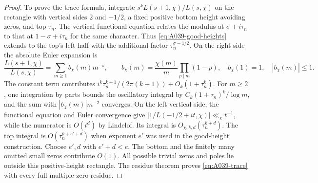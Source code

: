 \begin{proof}
To prove the trace formula, integrate
$s^kL(s+1,\chi)/L(s,\chi)$ on the rectangle with vertical
sides $2$ and $-1/2$, a fixed positive bottom height avoiding
zeros, and top $\tau_n$. The vertical functional equation
relates the modulus at $\sigma+i\tau_n$ to that at
$1-\sigma+i\tau_n$ for the same character. Thus
\eqref{eq:A039-good-heights} extends to the top's left half
with the additional factor $\tau_n^{\sigma-1/2}$.
On the right side the absolute Euler expansion is
\[
 \frac{L(s+1,\chi)}{L(s,\chi)}
   =\sum_{m\ge1}b_\chi(m)m^{-s},\qquad
 b_\chi(m)=\frac{\chi(m)}m\prod_{p\mid m}(1-p),
 \quad b_\chi(1)=1,\quad |b_\chi(m)|\le1.
\]
The constant term contributes
$i^k\tau_n^{k+1}/(2\pi(k+1))+O_k(1+\tau_n^k)$.
For $m\ge2$, one integration by parts bounds the oscillatory
integral by $C_k(1+\tau_n)^k/\log m$, and the sum with
$|b_\chi(m)|m^{-2}$ converges. On the left vertical side,
the functional equation and Euler convergence give
$|1/L(-1/2+it,\chi)|\ll_\chi t^{-1}$, while the numerator
is $O(t^d)$ by Lindelof. Its integral is
$O_{\chi,k,d}(\tau_n^{k+d})$. The top integral is
$O(\tau_n^{k+e'+d})$ when exponent $e'$ was used in the
good-height construction. Choose $e',d$ with $e'+d<e$.
The bottom and the finitely many omitted small zeros contribute
$O(1)$. All possible trivial zeros and poles lie outside this
positive-height rectangle. The residue theorem proves
\eqref{eq:A039-trace} with every full multiple-zero residue.
\end{proof}


